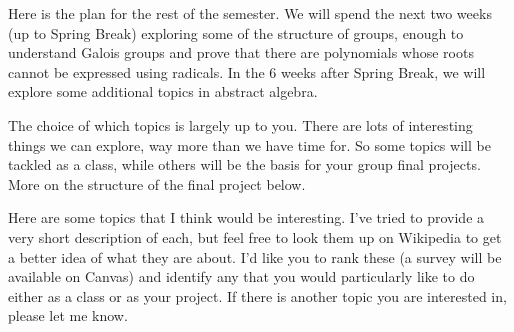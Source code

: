 \documentclass[10pt,letterpaper]{article}
\begin{document}
Here is the plan for the rest of the semester.  We will spend the next two weeks (up to Spring Break) exploring some of the structure of groups, enough to understand Galois groups and prove that there are polynomials whose roots cannot be expressed using radicals.  In the 6 weeks after Spring Break, we will explore some additional topics in abstract algebra.  

The choice of which topics is largely up to you.  There are lots of interesting things we can explore, way more than we have time for.  So some topics will be tackled as a class, while others will be the basis for your group final projects.  More on the structure of the final project below.

Here are some topics that I think would be interesting.  I've tried to provide a very short description of each, but feel free to look them up on Wikipedia to get a better idea of what they are about.  I'd like you to rank these (a survey will be available on Canvas) and identify any that you would particularly like to do either as a class or as your project.  If there is another topic you are interested in, please let me know.
\end{document}

